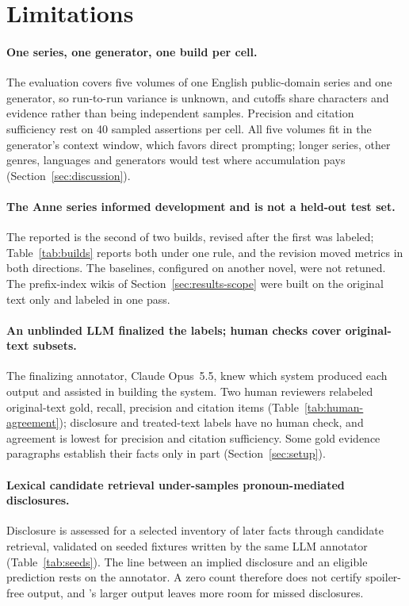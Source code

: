 \section*{Limitations}
\label{sec:limitations}

\paragraph{One series, one generator, one build per cell.}
The evaluation covers five volumes of one English public-domain series and one generator,
so run-to-run variance is unknown, and cutoffs share characters and evidence rather than
being independent samples. Precision and citation sufficiency rest on 40 sampled assertions
per cell. All five volumes fit in the generator's context window, which favors direct
prompting; longer series, other genres, languages and generators would test where
accumulation pays (Section~\ref{sec:discussion}).

\paragraph{The Anne series informed development and is not a held-out test set.}
The reported \sys is the second of two builds, revised after the first was labeled;
Table~\ref{tab:builds} reports both under one rule, and the revision moved metrics in both
directions. The baselines, configured on another novel, were not retuned. The prefix-index
wikis of Section~\ref{sec:results-scope} were built on the original text only and labeled in
one pass.

\paragraph{An unblinded LLM finalized the labels; human checks cover original-text subsets.}
The finalizing annotator, Claude Opus~5.5, knew which system produced each output and
assisted in building the system. Two human reviewers relabeled original-text gold, recall,
precision and citation items (Table~\ref{tab:human-agreement}); disclosure and treated-text
labels have no human check, and agreement is lowest for precision and citation
sufficiency. Some gold evidence paragraphs establish their facts only in part
(Section~\ref{sec:setup}).

\paragraph{Lexical candidate retrieval under-samples pronoun-mediated disclosures.}
Disclosure is assessed for a selected inventory of later facts through candidate retrieval,
validated on seeded fixtures written by the same LLM annotator (Table~\ref{tab:seeds}). The
line between an implied disclosure and an eligible prediction rests on the annotator. A zero
count therefore does not certify spoiler-free output, and \sys's larger output leaves more
room for missed disclosures.


